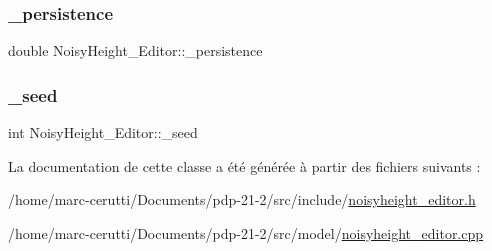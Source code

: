 \mbox{\label{class_noisy_height___editor_aa0752875febd6605a9c0ecdf040c6f48}} 
\subsubsection{\texorpdfstring{\+\_\+persistence}{\_persistence}}
{\footnotesize\ttfamily double Noisy\+Height\+\_\+\+Editor\+::\+\_\+persistence\hspace{0.3cm}{\ttfamily [private]}}

\mbox{\label{class_noisy_height___editor_a8765f88743f3ea7f2c850a9415060287}} 
\subsubsection{\texorpdfstring{\+\_\+seed}{\_seed}}
{\footnotesize\ttfamily int Noisy\+Height\+\_\+\+Editor\+::\+\_\+seed\hspace{0.3cm}{\ttfamily [private]}}



La documentation de cette classe a été générée à partir des fichiers suivants \+:\begin{DoxyCompactItemize}
\item 
/home/marc-\/cerutti/\+Documents/pdp-\/21-\/2/src/include/\hyperlink{noisyheight__editor_8h}{noisyheight\+\_\+editor.\+h}\item 
/home/marc-\/cerutti/\+Documents/pdp-\/21-\/2/src/model/\hyperlink{noisyheight__editor_8cpp}{noisyheight\+\_\+editor.\+cpp}\end{DoxyCompactItemize}

